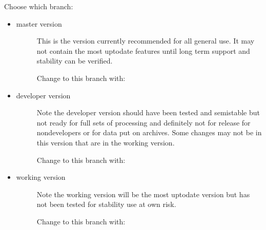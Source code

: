 \documentclass[a4paper,10pt,english]{report}
\begin{document}
Choose which branch:
\begin{itemize}
\item {} \begin{description}
\item[{master version}] \leavevmode
This is the version currently recommended for all general use.
It may not contain the most up\sphinxhyphen{}to\sphinxhyphen{}date features until long term support
and stability can be verified.

Change to this branch with:

\begin{sphinxVerbatim}[commandchars=\\\{\}]
   
    
\end{sphinxVerbatim}

\end{description}

\item {} \begin{description}
\item[{developer version}] \leavevmode
Note the developer version should have been tested and semi\sphinxhyphen{}stable but
not ready for full sets of processing and definitely not for release for
non\sphinxhyphen{}developers or for data put on archives. Some changes may not be
in this version that are in the working version.

Change to this branch with:

\begin{sphinxVerbatim}[commandchars=\\\{\}]
   
    
\end{sphinxVerbatim}

\end{description}

\item {} \begin{description}
\item[{working version}] \leavevmode
Note the working version will be the most up\sphinxhyphen{}to\sphinxhyphen{}date version but has not been
tested for stability \sphinxhyphen{} use at own risk.

Change to this branch with:

\begin{sphinxVerbatim}[commandchars=\\\{\}]
   
    
\end{sphinxVerbatim}

\end{description}

\end{itemize}
\end{document}
